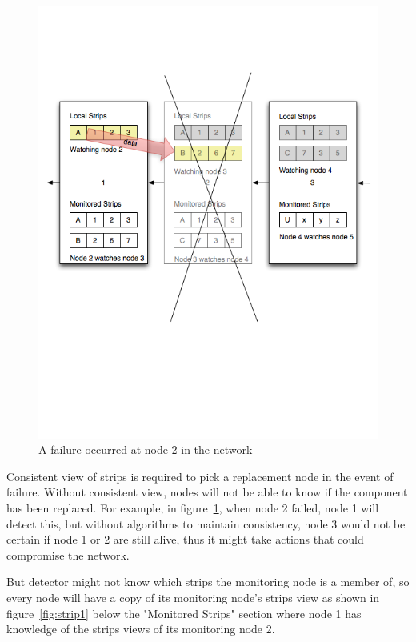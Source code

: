 \begin{figure}[h!]
\caption{A failure occurred at node 2 in the network}
\label{fig:strip3}
\centering
    \includegraphics[width=\linewidth]{figures/strip3}
\end{figure}

Consistent view of strips is required to pick a replacement node in the event
of failure. Without consistent view, nodes will not be able to know if the
component has been replaced.
For example, in figure~\ref{fig:strip3}, when node 2 failed, node 1 will detect
this, but without algorithms to maintain consistency, node 3 would not be
certain if node 1 or 2 are still alive, thus it might take actions that could
compromise the network.

But detector might not know which strips the monitoring node is a member of, so
every node will have a copy of its monitoring node's strips view as shown in
figure~\ref{fig:strip1} below the "Monitored Strips" section where node 1 has
knowledge of the strips views of its monitoring node 2.

